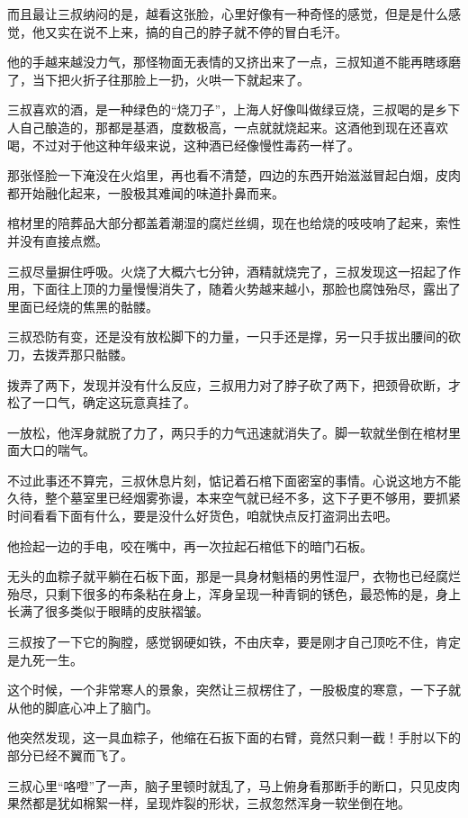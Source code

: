 而且最让三叔纳闷的是，越看这张脸，心里好像有一种奇怪的感觉，但是是什么感觉，他又实在说不上来，搞的自己的脖子就不停的冒白毛汗。

他的手越来越没力气，那怪物面无表情的又挤出来了一点，三叔知道不能再瞎琢磨了，当下把火折子往那脸上一扔，火哄一下就起来了。

三叔喜欢的酒，是一种绿色的“烧刀子”，上海人好像叫做绿豆烧，三叔喝的是乡下人自己酿造的，那都是基酒，度数极高，一点就就烧起来。这酒他到现在还喜欢喝，不过对于他这种年级来说，这种酒已经像慢性毒药一样了。

那张怪脸一下淹没在火焰里，再也看不清楚，四边的东西开始滋滋冒起白烟，皮肉都开始融化起来，一股极其难闻的味道扑鼻而来。

棺材里的陪葬品大部分都盖着潮湿的腐烂丝绸，现在也给烧的吱吱响了起来，索性并没有直接点燃。

三叔尽量摒住呼吸。火烧了大概六七分钟，酒精就烧完了，三叔发现这一招起了作用，下面往上顶的力量慢慢消失了，随着火势越来越小，那脸也腐蚀殆尽，露出了里面已经烧的焦黑的骷髅。

三叔恐防有变，还是没有放松脚下的力量，一只手还是撑，另一只手拔出腰间的砍刀，去拨弄那只骷髅。

拨弄了两下，发现并没有什么反应，三叔用力对了脖子砍了两下，把颈骨砍断，才松了一口气，确定这玩意真挂了。

一放松，他浑身就脱了力了，两只手的力气迅速就消失了。脚一软就坐倒在棺材里面大口的喘气。

不过此事还不算完，三叔休息片刻，惦记着石棺下面密室的事情。心说这地方不能久待，整个墓室里已经烟雾弥谩，本来空气就已经不多，这下子更不够用，要抓紧时间看看下面有什么，要是没什么好货色，咱就快点反打盗洞出去吧。

他捡起一边的手电，咬在嘴中，再一次拉起石棺低下的暗门石板。

无头的血粽子就平躺在石板下面，那是一具身材魁梧的男性湿尸，衣物也已经腐烂殆尽，只剩下很多的布条粘在身上，浑身呈现一种青铜的锈色，最恐怖的是，身上长满了很多类似于眼睛的皮肤褶皱。

三叔按了一下它的胸膛，感觉钢硬如铁，不由庆幸，要是刚才自己顶吃不住，肯定是九死一生。

这个时候，一个非常寒人的景象，突然让三叔楞住了，一股极度的寒意，一下子就从他的脚底心冲上了脑门。

他突然发现，这一具血粽子，他缩在石扳下面的右臂，竟然只剩一截！手肘以下的部分已经不翼而飞了。

三叔心里“咯噔”了一声，脑子里顿时就乱了，马上俯身看那断手的断口，只见皮肉果然都是犹如棉絮一样，呈现炸裂的形状，三叔忽然浑身一软坐倒在地。

